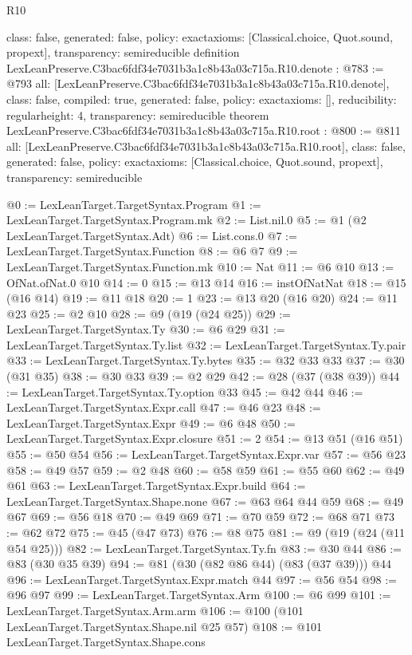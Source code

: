 \begin{lexlean}{R10}
\begin{coremodule}
{  class: false,
  generated: false,
  policy: exact{axioms: [Classical.choice, Quot.sound, propext]},
  transparency: semireducible
}
definition LexLeanPreserve.C3bac6fdf34e7031b3a1c8b43a03c715a.R10.denote : @783 := @793 {
  all: [LexLeanPreserve.C3bac6fdf34e7031b3a1c8b43a03c715a.R10.denote],
  class: false,
  compiled: true,
  generated: false,
  policy: exact{axioms: []},
  reducibility: regular{height: 4},
  transparency: semireducible
}
theorem LexLeanPreserve.C3bac6fdf34e7031b3a1c8b43a03c715a.R10.root : @800 := @811 {
  all: [LexLeanPreserve.C3bac6fdf34e7031b3a1c8b43a03c715a.R10.root],
  class: false,
  generated: false,
  policy: exact{axioms: [Classical.choice, Quot.sound, propext]},
  transparency: semireducible
}

@0 := LexLeanTarget.TargetSyntax.Program
@1 := LexLeanTarget.TargetSyntax.Program.mk
@2 := List.nil.{0}
@5 := @1 (@2 LexLeanTarget.TargetSyntax.Adt)
@6 := List.cons.{0}
@7 := LexLeanTarget.TargetSyntax.Function
@8 := @6 @7
@9 := LexLeanTarget.TargetSyntax.Function.mk
@10 := Nat
@11 := @6 @10
@13 := OfNat.ofNat.{0} @10
@14 := 0
@15 := @13 @14
@16 := instOfNatNat
@18 := @15 (@16 @14)
@19 := @11 @18
@20 := 1
@23 := @13 @20 (@16 @20)
@24 := @11 @23
@25 := @2 @10
@28 := @9 (@19 (@24 @25))
@29 := LexLeanTarget.TargetSyntax.Ty
@30 := @6 @29
@31 := LexLeanTarget.TargetSyntax.Ty.list
@32 := LexLeanTarget.TargetSyntax.Ty.pair
@33 := LexLeanTarget.TargetSyntax.Ty.bytes
@35 := @32 @33 @33
@37 := @30 (@31 @35)
@38 := @30 @33
@39 := @2 @29
@42 := @28 (@37 (@38 @39))
@44 := LexLeanTarget.TargetSyntax.Ty.option @33
@45 := @42 @44
@46 := LexLeanTarget.TargetSyntax.Expr.call
@47 := @46 @23
@48 := LexLeanTarget.TargetSyntax.Expr
@49 := @6 @48
@50 := LexLeanTarget.TargetSyntax.Expr.closure
@51 := 2
@54 := @13 @51 (@16 @51)
@55 := @50 @54
@56 := LexLeanTarget.TargetSyntax.Expr.var
@57 := @56 @23
@58 := @49 @57
@59 := @2 @48
@60 := @58 @59
@61 := @55 @60
@62 := @49 @61
@63 := LexLeanTarget.TargetSyntax.Expr.build
@64 := LexLeanTarget.TargetSyntax.Shape.none
@67 := @63 @64 @44 @59
@68 := @49 @67
@69 := @56 @18
@70 := @49 @69
@71 := @70 @59
@72 := @68 @71
@73 := @62 @72
@75 := @45 (@47 @73)
@76 := @8 @75
@81 := @9 (@19 (@24 (@11 @54 @25)))
@82 := LexLeanTarget.TargetSyntax.Ty.fn
@83 := @30 @44
@86 := @83 (@30 @35 @39)
@94 := @81 (@30 (@82 @86 @44) (@83 (@37 @39))) @44
@96 := LexLeanTarget.TargetSyntax.Expr.match @44
@97 := @56 @54
@98 := @96 @97
@99 := LexLeanTarget.TargetSyntax.Arm
@100 := @6 @99
@101 := LexLeanTarget.TargetSyntax.Arm.arm
@106 := @100 (@101 LexLeanTarget.TargetSyntax.Shape.nil @25 @57)
@108 := @101 LexLeanTarget.TargetSyntax.Shape.cons

\end{coremodule}
\end{lexlean}
